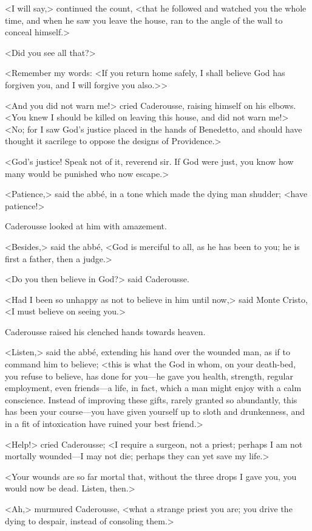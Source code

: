  <I will say,> continued the count, <that he followed and watched you the whole time, and when he saw you leave the house, ran to the angle of the wall to conceal himself.> 

 <Did you see all that?> 

 <Remember my words: <If you return home safely, I shall believe God has forgiven you, and I will forgive you also.>> 

 <And you did not warn me!> cried Caderousse, raising himself on his elbows. <You knew I should be killed on leaving this house, and did not warn me!>  <No; for I saw God's justice placed in the hands of Benedetto, and should have thought it sacrilege to oppose the designs of Providence.> 

 <God's justice! Speak not of it, reverend sir. If God were just, you know how many would be punished who now escape.> 

 <Patience,> said the abbé, in a tone which made the dying man shudder; <have patience!> 

 Caderousse looked at him with amazement. 

 <Besides,> said the abbé, <God is merciful to all, as he has been to you; he is first a father, then a judge.> 

 <Do you then believe in God?> said Caderousse. 

 <Had I been so unhappy as not to believe in him until now,> said Monte Cristo, <I must believe on seeing you.> 

 Caderousse raised his clenched hands towards heaven. 

 <Listen,> said the abbé, extending his hand over the wounded man, as if to command him to believe; <this is what the God in whom, on your death-bed, you refuse to believe, has done for you—he gave you health, strength, regular employment, even friends—a life, in fact, which a man might enjoy with a calm conscience. Instead of improving these gifts, rarely granted so abundantly, this has been your course—you have given yourself up to sloth and drunkenness, and in a fit of intoxication have ruined your best friend.> 

 <Help!> cried Caderousse; <I require a surgeon, not a priest; perhaps I am not mortally wounded—I may not die; perhaps they can yet save my life.> 

 <Your wounds are so far mortal that, without the three drops I gave you, you would now be dead. Listen, then.> 

 <Ah,> murmured Caderousse, <what a strange priest you are; you drive the dying to despair, instead of consoling them.> 

